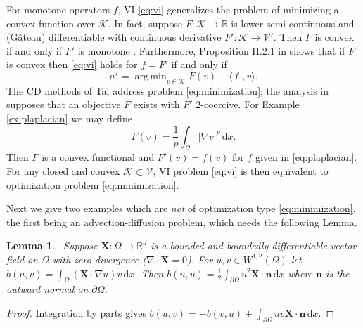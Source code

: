\documentclass[letterpaper,final,12pt,reqno]{amsart}
\theoremstyle{cstyle}
\newtheorem{lemma}[theorem]{Lemma}
\theoremstyle{cstyle*}
\theoremstyle{dstyle}
\numberwithin{equation}{section}
\numberwithin{figure}{section}
\numberwithin{table}{section}
\numberwithin{theorem}{section}
\newcommand{\RR}{\mathbb{R}}
\newcommand{\grad}{\nabla}
\newcommand{\Div}{\nabla\cdot}
\newcommand{\bn}{\mathbf{n}}
\newcommand{\bX}{\mathbf{X}}
\newcommand{\cK}{\mathcal{K}}
\newcommand{\cV}{\mathcal{V}}
\newcommand{\ip}[2]{\langle#1,#2\rangle}
\newcommand{\dx}{\, \mathrm{d}x}
\DeclareMathOperator*{\argmin}{arg\,min}
\begin{document}
For monotone operators $f$, VI \eqref{eq:vi} generalizes the problem of minimizing a convex function over $\cK$.  In fact, suppose $F:\cK \to \RR$ is lower semi-continuous and (G\^ateau) differentiable with continuous derivative $F':\cK \to \cV'$.  Then $F$ is convex if and only if $F'$ is monotone \cite[Proposition I.5.5]{EkelandTemam1976}.  Furthermore, Proposition II.2.1 in \cite{EkelandTemam1976} shows that if $F$ is convex then \eqref{eq:vi} holds for $f=F'$ if and only if
\begin{equation}
u^\star = \argmin_{v\in\cK} F(v) - \ip{\ell}{v}. \label{eq:minimization}
\end{equation}
The CD methods of Tai \cite{Tai2003} address problem \eqref{eq:minimization}; the analysis in \cite{Tai2003} supposes that an objective $F$ exists with $F'$ 2-coercive.  For Example \ref{ex:plaplacian} we may define
\begin{equation}
F(v) = \frac{1}{p} \int_\Omega |\grad v|^p\dx. \label{eq:plaplacianobjective}
\end{equation}
Then $F$ is a convex functional and $F'(v) = f(v)$ for $f$ given in \eqref{eq:plaplacian}.  For any closed and convex $\cK\subset \cV$, VI problem \eqref{eq:vi} is then equivalent to optimization problem \eqref{eq:minimization}.

Next we give two examples which are \emph{not} of optimization type \eqref{eq:minimization}, the first being an advection-diffusion problem, which needs the following Lemma.

\begin{lemma}  \label{lem:advectionskew}  \cite{Elmanetal2014}\,  Suppose $\bX :\Omega \to \RR^d$ is a bounded and boundedly-differentiable vector field on $\Omega$ with zero divergence ($\Div \bX=0$).  For $u,v \in W^{1,2}(\Omega)$ let $b(u,v) = \int_\Omega (\bX \cdot \grad u) v\dx$.  Then $b(u,u) = \frac{1}{2} \int_{\partial \Omega} u^2 \bX\cdot \bn\dx$ where $\bn$ is the outward normal on $\partial \Omega$.
\end{lemma}

\begin{proof}
Integration by parts gives $b(u,v) = - b(v,u) + \int_{\partial \Omega} uv \bX\cdot \bn\dx$.
\end{proof}
\end{document}
